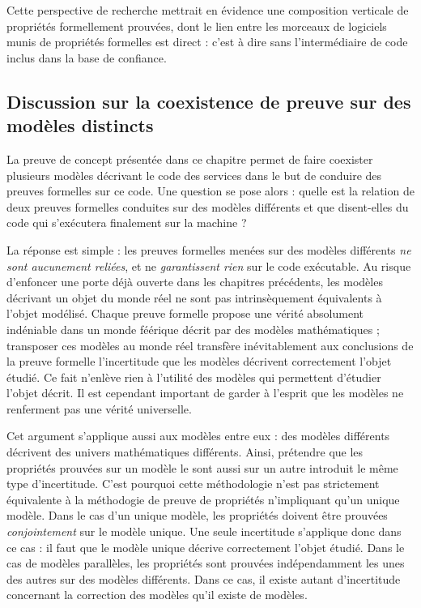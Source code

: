 		Cette perspective de recherche mettrait en évidence une composition verticale de propriétés formellement prouvées, dont le lien entre les morceaux de logiciels munis de propriétés formelles est direct : c'est à dire sans l'intermédiaire de code inclus dans la base de confiance. 

		\subsection{Discussion sur la coexistence de preuve sur des modèles distincts}

		La preuve de concept présentée dans ce chapitre permet de faire coexister plusieurs modèles décrivant le code des services dans le but de conduire des preuves formelles sur ce code. Une question se pose alors : quelle est la relation de deux preuves formelles conduites sur des modèles différents et que disent-elles du code qui s'exécutera finalement sur la machine ?

		La réponse est simple : les preuves formelles menées sur des modèles différents \emph{ne sont aucunement reliées}, et ne \emph{garantissent rien} sur le code exécutable. Au risque d'enfoncer une porte déjà ouverte dans les chapitres précédents, les modèles décrivant un objet du monde réel ne sont pas intrinsèquement équivalents à l'objet modélisé. Chaque preuve formelle propose une vérité absolument indéniable dans un monde féérique décrit par des modèles mathématiques ; transposer ces modèles au monde réel transfère inévitablement aux conclusions de la preuve formelle l'incertitude que les modèles décrivent correctement l'objet étudié. Ce fait n'enlève rien à l'utilité des modèles qui permettent d'étudier l'objet décrit. Il est cependant important de garder à l'esprit que les modèles ne renferment pas une vérité universelle.

		Cet argument s'applique aussi aux modèles entre eux : des modèles différents décrivent des univers mathématiques différents. Ainsi, prétendre que les propriétés prouvées sur un modèle le sont aussi sur un autre introduit le même type d'incertitude. C'est pourquoi cette méthodologie n'est pas strictement équivalente à la méthodogie de preuve de propriétés n'impliquant qu'un unique modèle. Dans le cas d'un unique modèle, les propriétés doivent être prouvées \emph{conjointement} sur le modèle unique. Une seule incertitude s'applique donc dans ce cas : il faut que le modèle unique décrive correctement l'objet étudié. Dans le cas de modèles parallèles, les propriétés sont prouvées indépendamment les unes des autres sur des modèles différents. Dans ce cas, il existe autant d'incertitude concernant la correction des modèles qu'il existe de modèles.

